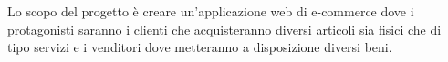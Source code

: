 Lo scopo del progetto è creare un'applicazione web di e-commerce dove i protagonisti saranno i clienti che acquisteranno diversi articoli sia fisici che di tipo servizi e i venditori dove metteranno a disposizione diversi beni. 